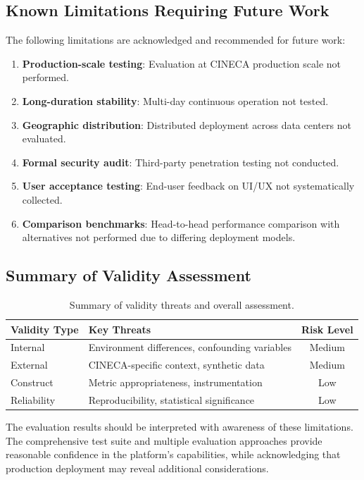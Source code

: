 \subsection{Known Limitations Requiring Future Work}

The following limitations are acknowledged and recommended for future work:

\begin{enumerate}
    \item \textbf{Production-scale testing}: Evaluation at CINECA production scale not performed.
    
    \item \textbf{Long-duration stability}: Multi-day continuous operation not tested.
    
    \item \textbf{Geographic distribution}: Distributed deployment across data centers not evaluated.
    
    \item \textbf{Formal security audit}: Third-party penetration testing not conducted.
    
    \item \textbf{User acceptance testing}: End-user feedback on UI/UX not systematically collected.
    
    \item \textbf{Comparison benchmarks}: Head-to-head performance comparison with alternatives not performed due to differing deployment models.
\end{enumerate}

\subsection{Summary of Validity Assessment}

\begin{table}[ht]
\centering
\caption{Summary of validity threats and overall assessment.}
\label{tab:validity-summary}
\small
\begin{tabular}{llc}
\hline
\textbf{Validity Type} & \textbf{Key Threats} & \textbf{Risk Level} \\
\hline
Internal & Environment differences, confounding variables & Medium \\
External & CINECA-specific context, synthetic data & Medium \\
Construct & Metric appropriateness, instrumentation & Low \\
Reliability & Reproducibility, statistical significance & Low \\
\hline
\end{tabular}
\end{table}

The evaluation results should be interpreted with awareness of these limitations. The comprehensive test suite and multiple evaluation approaches provide reasonable confidence in the platform's capabilities, while acknowledging that production deployment may reveal additional considerations.

